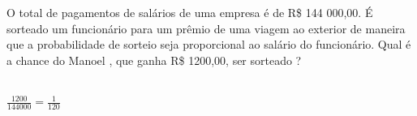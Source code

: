 \begin{ex}
 O total de pagamentos de salários de uma empresa é de R\$
144 000,00. É sorteado um funcionário para um prêmio de uma viagem ao exterior de maneira que a probabilidade de sorteio seja proporcional ao salário do funcionário.    Qual é a chance do Manoel , que ganha R\$  1200,00, ser sorteado ?
 \begin{sol}
   \phantom{A} \\
   $\frac{1200}{144000}=\frac{1}{120}$
 \end{sol}
\end{ex}
